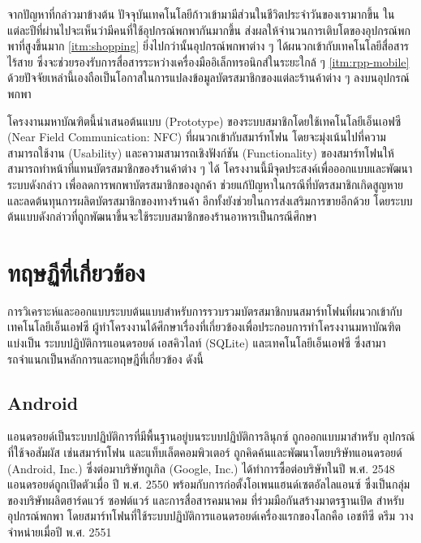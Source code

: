 \documentclass[a4paper]{article}
\begin{document}
จากปัญหาที่กล่าวมาข้างต้น ปัจจุบันเทคโนโลยีก้าวเข้ามามีส่วนในชีวิตประจำวันของเรามากขึ้น ในแต่ละปีที่ผ่านไปจะเห็นว่ามีคนที่ใช้อุปกรณ์พกพากันมากขึ้น ส่งผลให้จำนวนการเติบโตของอุปกรณ์พกพาที่สูงขึ้นมาก \ref{itm:shopping} ยิ่งไปกว่านั้นอุปกรณ์พกพาต่าง ๆ ได้ผนวกเข้ากับเทคโนโลยีสื่อสารไร้สาย ซึ่งจะช่วยรองรับการสื่อสารระหว่างเครื่องมืออิเล็กทรอนิกส์ในระยะใกล้ ๆ \ref{itm:rpp-mobile} ด้วยปัจจัยเหล่านี้เองถือเป็นโอกาสในการแปลงข้อมูลบัตรสมาชิกของแต่ละร้านค้าต่าง ๆ ลงบนอุปกรณ์พกพา 

โครงงานมหาบัณฑิตนี้นำเสนอต้นแบบ (Prototype) ของระบบสมาชิกโดยใช้เทคโนโลยีเอ็นเอฟซี (Near Field Communication: NFC) ที่ผนวกเข้ากับสมาร์ทโฟน โดยจะมุ่งเน้นไปที่ความสามารถใช้งาน (Usability) และความสามารถเชิงฟังก์ชัน (Functionality) ของสมาร์ทโฟนให้สามารถทำหน้าที่แทนบัตรสมาชิกของร้านค้าต่าง ๆ ได้ โครงงานนี้มีจุดประสงค์เพื่อออกแบบและพัฒนาระบบดังกล่าว เพื่อลดการพกพาบัตรสมาชิกของลูกค้า ช่วยแก้ปัญหาในกรณีที่บัตรสมาชิกเกิดสูญหาย และลดต้นทุนการผลิตบัตรสมาชิกของทางร้านค้า อีกทั้งยังช่วยในการส่งเสริมการขายอีกด้วย โดยระบบต้นแบบดังกล่าวที่ถูกพัฒนาขึ้นจะใช้ระบบสมาชิกของร้านอาหารเป็นกรณีศึกษา


\section{ทฤษฏีที่เกี่ยวข้อง}
การวิเคราะห์และออกแบบระบบต้นแบบสำหรับการรวบรวมบัตรสมาชิกบนสมาร์ทโฟนที่ผนวกเข้ากับเทคโนโลยีเอ็นเอฟซี ผู้ทำโครงงานได้ศึกษาเรื่องที่เกี่ยวข้องเพื่อประกอบการทําโครงงานมหาบัณฑิต แบ่งเป็น ระบบปฏิบัติการแอนดรอยด์ เอสคิวไลท์ (SQLite) และเทคโนโลยีเอ็นเอฟซี ซึ่งสามารถจําแนกเป็นหลักการและทฤษฎีที่เกี่ยวข้อง ดังนี้

\subsection{Android}
แอนดรอยด์เป็นระบบปฏิบัติการที่มีพื้นฐานอยู่บนระบบปฏิบัติการลินุกซ์ ถูกออกแบบมาสำหรับ \newline อุปกรณ์ที่ใช้จอสัมผัส เช่นสมาร์ทโฟน และแท็บเล็ตคอมพิวเตอร์ ถูกคิดค้นและพัฒนาโดยบริษัทแอนดรอยด์ (Android, Inc.) ซึ่งต่อมาบริษัทกูเกิล (Google, Inc.) ได้ทำการซื้อต่อบริษัทในปี พ.ศ. 2548 \newline แอนดรอยด์ถูกเปิดตัวเมื่อ ปี พ.ศ. 2550 พร้อมกับการก่อตั้งโอเพนแฮนด์เซตอัลไลแอนซ์ ซึ่งเป็นกลุ่มของบริษัทผลิตฮาร์ดแวร์ ซอฟต์แวร์ และการสื่อสารคมนาคม ที่ร่วมมือกันสร้างมาตรฐานเปิด สำหรับอุปกรณ์พกพา โดยสมาร์ทโฟนที่ใช้ระบบปฏิบัติการแอนดรอยด์เครื่องแรกของโลกคือ เอชทีซี ดรีม วางจำหน่ายเมื่อปี พ.ศ. 2551
\end{document}
